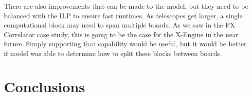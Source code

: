 There are also improvements that can be made to the model, but they need to be balanced with the ILP to ensure fast runtimes.
As telescopes get larger, a single computational block may need to span multiple boards.
As we saw in the FX Correlator case study, this is going to be the case for the X-Engine in the near future.
Simply supporting that capability would be useful, but it would be better if model was able to determine how to split these blocks between boards.





\section{Conclusions}